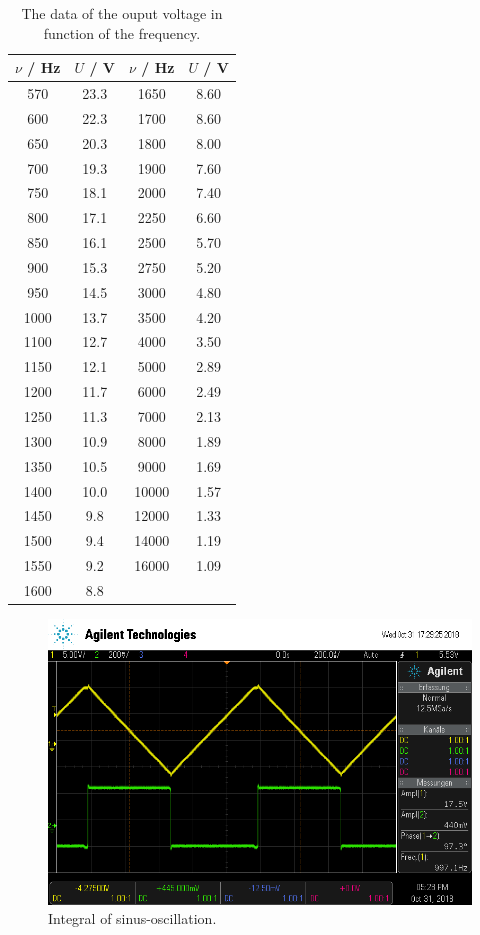 \begin{table}
  \centering
  \caption{The data of the ouput voltage in function of the frequency.}
  \label{tab:2}
  \begin{tabular}{c c| c c}
    \toprule
    $\nu$ / \si{\hertz} & $U$ / \si{\volt} & $\nu$ / \si{\hertz} & $U$ / \si{\volt} \\
    \midrule
    570  & 23.3  &  1650  & 8.60 \\
    600  & 22.3  &  1700  & 8.60 \\
    650  & 20.3  &  1800  & 8.00 \\
    700  & 19.3  &  1900  & 7.60 \\
    750  & 18.1  &  2000  & 7.40 \\
    800  & 17.1  &  2250  & 6.60 \\
    850  & 16.1  &  2500  & 5.70 \\
    900  & 15.3  &  2750  & 5.20 \\
    950  & 14.5  &  3000  & 4.80 \\
    1000 & 13.7  &  3500  & 4.20 \\
    1100 & 12.7  &  4000  & 3.50 \\
    1150 & 12.1  &  5000  & 2.89 \\
    1200 & 11.7  &  6000  & 2.49 \\
    1250 & 11.3  &  7000  & 2.13 \\
    1300 & 10.9  &  8000  & 1.89 \\
    1350 & 10.5  &  9000  & 1.69 \\
    1400 & 10.0  &  10000 & 1.57 \\
    1450 & 9.8   &  12000 & 1.33 \\
    1500 & 9.4   &  14000 & 1.19 \\
    1550 & 9.2   &  16000 & 1.09 \\
    1600 & 8.8   &        &      \\
    \bottomrule
  \end{tabular}
\end{table}
\begin{figure}
  \centering
  \includegraphics[scale=0.5]{scope_2.png}
  \caption{Integral of sinus-oscillation.}
  \label{abb:1}
\end{figure}
